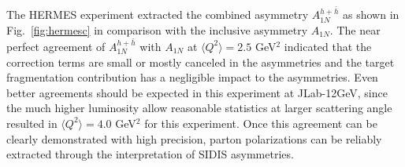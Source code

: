 The HERMES experiment extracted the combined asymmetry $A_{1N}^{h + \bar{h}}$ as shown in 
Fig.~\ref{fig:hermesc} in comparison with the inclusive asymmetry $A_{1N}$.
The near perfect agreement of $A_{1N}^{h + \bar{h}}$ with $A_{1N}$ at $\langle Q^2 \rangle =2.5$ GeV$^2$ 
indicated that the \nlo correction terms are small or mostly canceled 
in the asymmetries and the target fragmentation contribution has a negligible impact to the asymmetries. 
Even better agreements should be expected in this experiment at JLab-12GeV, since the much higher luminosity allow 
reasonable statistics at larger scattering angle resulted in $\langle Q^2 \rangle =4.0$ GeV$^2$ for this experiment.
Once this agreement can be clearly demonstrated with high precision,
parton polarizations can be reliably extracted through the \lo interpretation of SIDIS asymmetries.  


